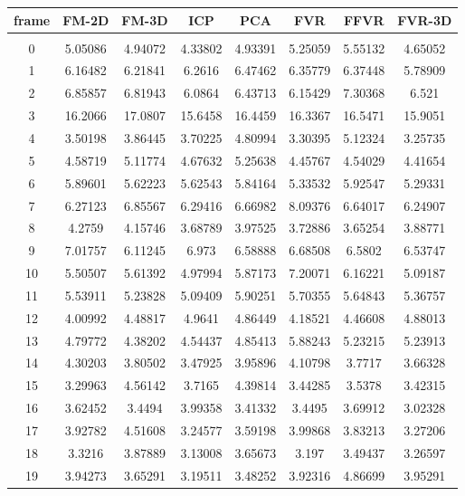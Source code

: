 
\begin{center}
\begin{longtable}{cccccccc}
\hline
\textbf{frame} & \textbf{FM-2D} & \textbf{FM-3D} & \textbf{ICP} & \textbf{PCA} & \textbf{FVR} & \textbf{FFVR} & \textbf{FVR-3D} \\
\hline \\
0 & 5.05086 & 4.94072 & 4.33802 & 4.93391 & 5.25059 & 5.55132 & 4.65052\\
1 & 6.16482 & 6.21841 & 6.2616 & 6.47462 & 6.35779 & 6.37448 & 5.78909\\
2 & 6.85857 & 6.81943 & 6.0864 & 6.43713 & 6.15429 & 7.30368 & 6.521\\
3 & 16.2066 & 17.0807 & 15.6458 & 16.4459 & 16.3367 & 16.5471 & 15.9051\\
4 & 3.50198 & 3.86445 & 3.70225 & 4.80994 & 3.30395 & 5.12324 & 3.25735\\
5 & 4.58719 & 5.11774 & 4.67632 & 5.25638 & 4.45767 & 4.54029 & 4.41654\\
6 & 5.89601 & 5.62223 & 5.62543 & 5.84164 & 5.33532 & 5.92547 & 5.29331\\
7 & 6.27123 & 6.85567 & 6.29416 & 6.66982 & 8.09376 & 6.64017 & 6.24907\\
8 & 4.2759 & 4.15746 & 3.68789 & 3.97525 & 3.72886 & 3.65254 & 3.88771\\
9 & 7.01757 & 6.11245 & 6.973 & 6.58888 & 6.68508 & 6.5802 & 6.53747\\
10 & 5.50507 & 5.61392 & 4.97994 & 5.87173 & 7.20071 & 6.16221 & 5.09187\\
11 & 5.53911 & 5.23828 & 5.09409 & 5.90251 & 5.70355 & 5.64843 & 5.36757\\
12 & 4.00992 & 4.48817 & 4.9641 & 4.86449 & 4.18521 & 4.46608 & 4.88013\\
13 & 4.79772 & 4.38202 & 4.54437 & 4.85413 & 5.88243 & 5.23215 & 5.23913\\
14 & 4.30203 & 3.80502 & 3.47925 & 3.95896 & 4.10798 & 3.7717 & 3.66328\\
15 & 3.29963 & 4.56142 & 3.7165 & 4.39814 & 3.44285 & 3.5378 & 3.42315\\
16 & 3.62452 & 3.4494 & 3.99358 & 3.41332 & 3.4495 & 3.69912 & 3.02328\\
17 & 3.92782 & 4.51608 & 3.24577 & 3.59198 & 3.99868 & 3.83213 & 3.27206\\
18 & 3.3216 & 3.87889 & 3.13008 & 3.65673 & 3.197 & 3.49437 & 3.26597\\
19 & 3.94273 & 3.65291 & 3.19511 & 3.48252 & 3.92316 & 4.86699 & 3.95291\\

\end{longtable}
\end{center}
